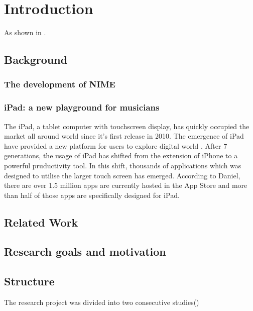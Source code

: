 \chapter{Introduction}

As shown in \citep{Reference1}.

\section{Background}

\subsection{The development of NIME}

\subsection{iPad: a new playground for musicians}

The iPad, a tablet computer with touchscreen display, has quickly occupied the market all around world since it's first release in 2010\citep{Reference2}. The emergence of iPad have provided a new platform for users to explore digital world \citep{Reference1}. After 7 generations, the usage of iPad has shifted from the extension of iPhone to a powerful pruductivity tool. In this shift, thousands of applications which was designed to utilise the larger touch screen has emerged. According to Daniel, there are over 1.5 million apps are currently hosted in the App Store and more than half of those apps are specifically designed for iPad\citep{lifewire}.


\section{Related Work}

\section{Research goals and motivation}

\section{Structure}

The research project was divided into two consecutive studies()
